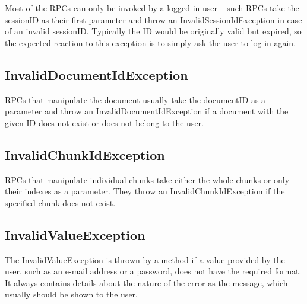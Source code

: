 Most of the RPCs can only be invoked by a logged in user -- such RPCs take the sessionID as their first parameter and throw an InvalidSessionIdException in case of an invalid sessionID. Typically the ID would be originally valid but expired, so the expected reaction to this exception is to simply ask the user to log in again.

\subsection{InvalidDocumentIdException}

RPCs that manipulate the document usually take the documentID as a parameter and throw an InvalidDocumentIdException if a document with the given ID does not exist or does not belong to the user.

\subsection{InvalidChunkIdException}

RPCs that manipulate individual chunks take either the whole chunks or only their indexes as a parameter. They throw an InvalidChunkIdException if the specified chunk does not exist.

\subsection{InvalidValueException}

The InvalidValueException is thrown by a method if a value provided by the user, such as an e-mail address or a password, does not have the required format. It always contains details about the nature of the error as the message, which usually should be shown to the user.
